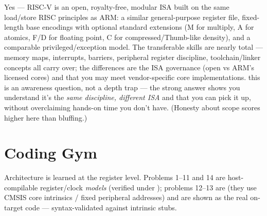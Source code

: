 Yes --- RISC-V is an open, royalty-free, modular ISA built on the same
load/store RISC principles as ARM: a similar general-purpose register file,
fixed-length base encodings with optional standard extensions (M for multiply,
A for atomics, F/D for floating point, C for compressed/Thumb-like density),
and a comparable privileged/exception model. The transferable skills are nearly
total --- memory maps, interrupts, barriers, peripheral register discipline,
toolchain/linker concepts all carry over; the differences are the ISA
governance (open vs ARM's licensed cores) and that you may meet vendor-specific
core implementations. \trap this is an awareness question, not a depth trap ---
the strong answer shows you understand it's the \emph{same discipline, different
ISA} and that you can pick it up, without overclaiming hands-on time you don't
have. (Honesty about scope scores higher here than bluffing.)

\section{Coding Gym}

\begin{partnote}
Architecture is learned at the register level. Problems 1--11 and 14 are
host-compilable register/clock \emph{models} (verified under
); problems 12--13 are 
(they use CMSIS core intrinsics / fixed peripheral addresses) and are shown as
the real on-target code --- syntax-validated against intrinsic stubs.
\end{partnote}

